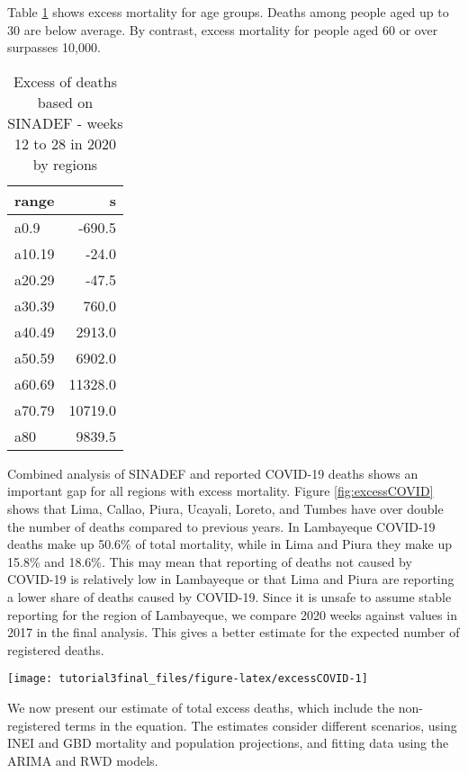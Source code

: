 \documentclass[
]{article}
\begin{document}
Table \ref{tab:excessage} shows excess mortality for age groups. Deaths among people aged up to 30 are below average. By contrast, excess mortality for people aged 60 or over surpasses 10,000.

\begin{table}[!h]

\caption{\label{tab:excessage}Excess of deaths based on SINADEF - weeks 12 to 28 in 2020 by regions}
\centering
\begin{tabular}[t]{lr}
\toprule
range & s\\
\midrule
a0.9 & -690.5\\
a10.19 & -24.0\\
a20.29 & -47.5\\
a30.39 & 760.0\\
a40.49 & 2913.0\\
\addlinespace
a50.59 & 6902.0\\
a60.69 & 11328.0\\
a70.79 & 10719.0\\
a80 & 9839.5\\
\bottomrule
\end{tabular}
\end{table}

Combined analysis of SINADEF and reported COVID-19 deaths shows an important gap for all regions with excess mortality. Figure \ref{fig:excessCOVID} shows that Lima, Callao, Piura, Ucayali, Loreto, and Tumbes have over double the number of deaths compared to previous years. In Lambayeque COVID-19 deaths make up 50.6\% of total mortality, while in Lima and Piura they make up 15.8\% and 18.6\%. This may mean that reporting of deaths not caused by COVID-19 is relatively low in Lambayeque or that Lima and Piura are reporting a lower share of deaths caused by COVID-19. Since it is unsafe to assume stable reporting for the region of Lambayeque, we compare 2020 weeks against values in 2017 in the final analysis. This gives a better estimate for the expected number of registered deaths.

\begin{center}\texttt{[image: tutorial3final\_files/figure-latex/excessCOVID-1]} \end{center}

We now present our estimate of total excess deaths, which include the non-registered terms in the equation. The estimates consider different scenarios, using INEI and GBD mortality and population projections, and fitting data using the \(\text{ARIMA}\) and \(\text{RWD}\) models.
\end{document}

